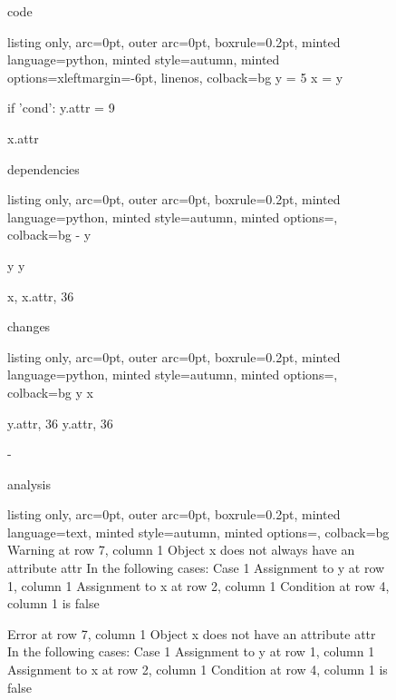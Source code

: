 \begin{figure}[!h]
 \begin{minipage}{0.32\textwidth}
 code
  \begin{tcblisting}{listing only, 
    arc=0pt,
    outer arc=0pt, 
    boxrule=0.2pt,
    minted language=python,
    minted style=autumn,
    minted options={xleftmargin=-6pt, linenos},
    colback=bg }
y = 5
x = y

if 'cond':
  y.attr = 9

x.attr
\end{tcblisting}
 \end{minipage}
 \begin{minipage}{0.32\textwidth}
 dependencies
  \begin{tcblisting}{listing only, 
    arc=0pt,
    outer arc=0pt, 
    boxrule=0.2pt,
    minted language=python,
    minted style=autumn,
    minted options={},
    colback=bg }
-
y

y
y

x, x.attr, 36
\end{tcblisting}
 \end{minipage}
 \begin{minipage}{0.32\textwidth}
 changes
  \begin{tcblisting}{listing only, 
    arc=0pt,
    outer arc=0pt, 
    boxrule=0.2pt,
    minted language=python,
    minted style=autumn,
    minted options={},
    colback=bg }
y
x

y.attr, 36
y.attr, 36

-
\end{tcblisting}
 \end{minipage}
 \begin{minipage}{\textwidth}
 \vspace{4pt}
 analysis
  \begin{tcblisting}{listing only, 
    arc=0pt,
    outer arc=0pt, 
    boxrule=0.2pt,
    minted language=text,
    minted style=autumn,
    minted options={},
    colback=bg }
Warning at row 7, column 1
  Object x does not always have an attribute attr
  In the following cases:
  Case 1
    Assignment to y at row 1, column 1
    Assignment to x at row 2, column 1
    Condition at row 4, column 1 is false

Error at row 7, column 1
  Object x does not have an attribute attr
  In the following cases:
  Case 1
    Assignment to y at row 1, column 1
    Assignment to x at row 2, column 1
    Condition at row 4, column 1 is false
\end{tcblisting}
 \end{minipage}
 \label{lst:representation_examples}
\end{figure}